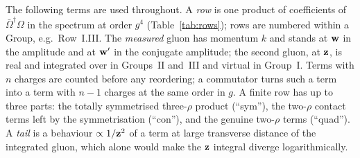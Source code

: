 The following terms are used throughout. A \emph{row} is one product of coefficients of $\bar\Omega^\dagger\Omega$ in the spectrum at order $g^4$ (Table~\ref{tab:rows}); rows are numbered within a Group, e.g.\ Row~I.III. The \emph{measured} gluon has momentum $k$ and stands at $\mathbf{w}$ in the amplitude and at $\mathbf{w}'$ in the conjugate amplitude; the second gluon, at $\mathbf{z}$, is real and integrated over in Groups~II and~III and virtual in Group~I. Terms with $n$ charges are counted before any reordering; a commutator turns such a term into a term with $n-1$ charges at the same order in $g$. A finite row has up to three parts: the totally symmetrised three-$\rho$ product (``sym''), the two-$\rho$ contact terms left by the symmetrisation (``con''), and the genuine two-$\rho$ terms (``quad''). A \emph{tail} is a behaviour $\propto1/\mathbf{z}^2$ of a term at large transverse distance of the integrated gluon, which alone would make the $\mathbf{z}$ integral diverge logarithmically.
